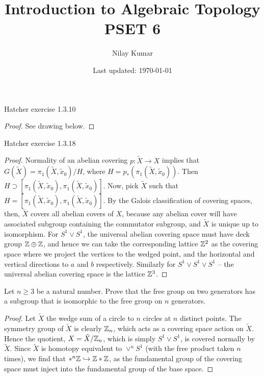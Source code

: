 \documentclass{../../mathnotes}
\title{Introduction to Algebraic Topology PSET 6}
\author{Nilay Kumar}
\date{Last updated: \today}
\begin{document}
\maketitle

\begin{prop}
    Hatcher exercise 1.3.10
\end{prop}
\begin{proof}
    See drawing below.
\end{proof}

\begin{prop}
    Hatcher exercise 1.3.18
\end{prop}
\begin{proof}
    Normality of an abelian covering $p:\tilde X\to X$ implies that $G(\tilde X)=\pi_1(\tilde X,\tilde x_0)/H$,
    where $H=p_*(\pi_1(\tilde X,\tilde x_0))$. Then $H\supset[\pi_1(\tilde X,\tilde x_0),\pi_1(\tilde X,\tilde x_0)]$.
    Now, pick $\tilde X$ such that $H=[\pi_1(\tilde X,\tilde x_0),\pi_1(\tilde X,\tilde x_0)]$.
    By the Galois classification of covering spaces, then, $\tilde X$ covers all abelian covers of $X$, because any
    abelian cover will have associated subgroup containing the commutator subgroup, and $\tilde X$ is
    unique up to isomorphism. For $S^1\vee S^1$, the universal abelian covering space must have deck
    group $\mathbb{Z}\oplus\mathbb{Z}$, and hence we can take the corresponding lattice $\mathbb{Z}^2$ as the covering space
    where we project the vertices to the wedged point, and the horizontal and vertical directions
    to $a$ and $b$ respectively. Similarly for $S^1\vee S^1\vee S^1$ -- the universal abelian covering space is
    the lattice $\mathbb{Z}^3$.
\end{proof}

\begin{prop}
    Let $n\geq 3$ be a natural number. Prove that the free group on two generators has a subgroup that is isomorphic
    to the free group on $n$ generators.
\end{prop}
\begin{proof}
    Let $\tilde X$ the wedge sum of a circle to $n$ circles at $n$ distinct points. The symmetry group
    of $\tilde X$ is clearly $\mathbb{Z}_n$, which acts as a covering space action on $\tilde X$. Hence the quotient,
    $X=\tilde X/\mathbb{Z}_n$, which is simply $S^1\vee S^1$, is covered normally by $\tilde X$. Since $\tilde X$
    is homotopy equivalent to $\vee^n S^1$ (with the free product taken $n$ times), we find that
    $*^n\mathbb{Z}\hookrightarrow\mathbb{Z}*\mathbb{Z}$, as the fundamental group of the covering space must inject
    into the fundamental group of the base space.
\end{proof}
\end{document}
